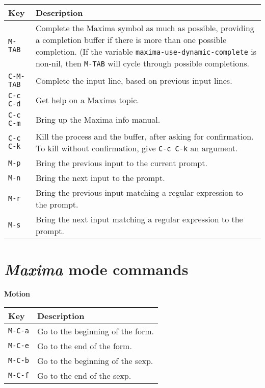 \documentclass{article}
\newcommand{\mx}{\textsl{\sffamily Maxima}}
\begin{document}
\begin{tabular}{p{\firstcol}p{\secondcol}}
\hline
\textbf{Key} & \textbf{Description}\\
\hline
\texttt{M-TAB} & Complete the Maxima symbol as much as possible, providing
     a completion buffer if there is more than one possible
     completion.  (If the variable
     \texttt{maxima-use-dynamic-complete} is non-nil, then
     \texttt{M-TAB} will cycle through possible completions.\\
\texttt{C-M-TAB} & Complete the input line, based on previous input lines.\\
\texttt{C-c C-d} & Get help on a Maxima topic.\\
\texttt{C-c C-m} & Bring up the Maxima info manual.\\
\texttt{C-c C-k} & Kill the process and the buffer, after asking for
  confirmation.  To kill without confirmation, give \texttt{C-c C-k} an
  argument.\\
\texttt{M-p} & Bring the previous input to the current prompt.\\
\texttt{M-n} & Bring the next input to the prompt.\\
\texttt{M-r} & Bring the previous input matching
  a regular expression to the prompt.\\
\texttt{M-s} & Bring the next input matching
  a regular expression to the prompt.
\end{tabular}

\newpage

\section{\mx{} mode commands}
\label{app:mxmode}

\smallskip

\noindent
\textbf{Motion}

\smallskip

\noindent
\begin{tabular}{p{\firstcol}p{\secondcol}}
\hline
\textbf{Key} & \textbf{Description}\\
\hline
\texttt{M-C-a} & Go to the beginning of the form.\\
\texttt{M-C-e} & Go to the end of the form.\\
\texttt{M-C-b} & Go to the beginning of the sexp.\\
\texttt{M-C-f} & Go to the end of the sexp.
\end{tabular}

\smallskip
\end{document}
